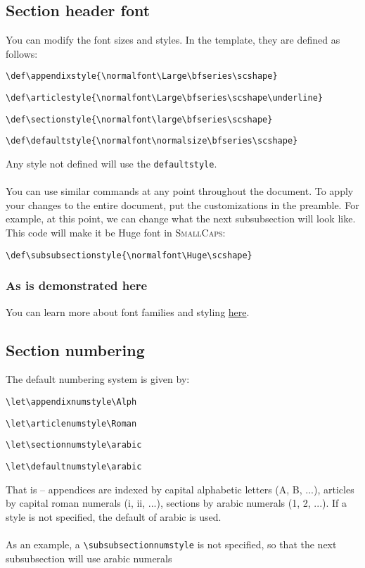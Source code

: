 \documentclass{constitution}
\begin{document}
\subsection{Section header font}
You can modify the font sizes and styles.
In the template, they are defined as follows:\par
\quad \verb|\def\appendixstyle{\normalfont\Large\bfseries\scshape}|\par
\quad \verb|\def\articlestyle{\normalfont\Large\bfseries\scshape\underline}|\par
\quad \verb|\def\sectionstyle{\normalfont\large\bfseries\scshape}|\par
\quad \verb|\def\defaultstyle{\normalfont\normalsize\bfseries\scshape}|\par
Any style not defined will use the \verb|defaultstyle|.
\\\\
You can use similar commands at any point throughout the document.
To apply your changes to the entire document, put the customizations in the preamble.
For example, at this point, we can change what the next subsubsection will look like.
This code will make it be {\Huge Huge} font in \textsc{SmallCaps}:\par
\quad \verb|\def\subsubsectionstyle{\normalfont\Huge\scshape}|\par
\def\subsubsectionstyle{\normalfont\Huge\scshape}
\subsubsection{As is demonstrated here}
\let\subsubsectionstyle\defaultstyle
You can learn more about font families and styling \href{https://www.overleaf.com/learn/latex/Font_sizes%2C_families%2C_and_styles}{here}.

\subsection{Section numbering}
The default numbering system is given by:\par
\quad \verb|\let\appendixnumstyle\Alph|\par
\quad \verb|\let\articlenumstyle\Roman|\par
\quad \verb|\let\sectionnumstyle\arabic|\par
\quad \verb|\let\defaultnumstyle\arabic|\par
That is -- appendices are indexed by capital alphabetic letters (A, B, ...), articles by capital roman numerals (i, ii, ...), sections by arabic numerals (1, 2, ...).
If a style is not specified, the default of arabic is used.
\\\\
As an example, a \verb|\subsubsectionnumstyle| is not specified, so that the next subsubsection will use arabic numerals
\end{document}
